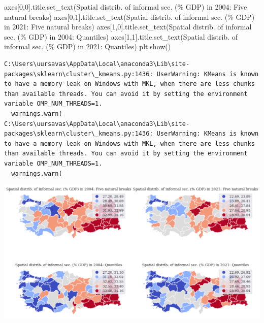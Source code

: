 \documentclass[
  letterpaper,
  DIV=11,
  numbers=noendperiod]{scrreprt}
\newenvironment{Shaded}{\begin{snugshade}}{\end{snugshade}}
\newcommand{\DecValTok}[1]{\textcolor[rgb]{0.68,0.00,0.00}{#1}}
\newcommand{\NormalTok}[1]{\textcolor[rgb]{0.00,0.23,0.31}{#1}}
\newcommand{\SpecialCharTok}[1]{\textcolor[rgb]{0.37,0.37,0.37}{#1}}
\newcommand{\StringTok}[1]{\textcolor[rgb]{0.13,0.47,0.30}{#1}}
\begin{document}
\begin{Shaded}
\begin{Highlighting}[]
\NormalTok{axes[}\DecValTok{0}\NormalTok{,}\DecValTok{0}\NormalTok{].title.set\_text(}\StringTok{\textquotesingle{}Spatial distrib. of informal sec. (}\SpecialCharTok{\% G}\StringTok{DP) in 2004: Five natural breaks\textquotesingle{}}\NormalTok{)}
\NormalTok{axes[}\DecValTok{0}\NormalTok{,}\DecValTok{1}\NormalTok{].title.set\_text(}\StringTok{\textquotesingle{}Spatial distrib. of informal sec. (}\SpecialCharTok{\% G}\StringTok{DP) in 2021: Five natural breaks\textquotesingle{}}\NormalTok{)}
\NormalTok{axes[}\DecValTok{1}\NormalTok{,}\DecValTok{0}\NormalTok{].title.set\_text(}\StringTok{\textquotesingle{}Spatial distrib. of informal sec. (}\SpecialCharTok{\% G}\StringTok{DP) in 2004: Quantiles\textquotesingle{}}\NormalTok{)}
\NormalTok{axes[}\DecValTok{1}\NormalTok{,}\DecValTok{1}\NormalTok{].title.set\_text(}\StringTok{\textquotesingle{}Spatial distrib. of informal sec. (}\SpecialCharTok{\% G}\StringTok{DP) in 2021: Quantiles\textquotesingle{}}\NormalTok{)}
\NormalTok{plt.show()}
\end{Highlighting}
\end{Shaded}

\begin{verbatim}
C:\Users\uursavas\AppData\Local\anaconda3\Lib\site-packages\sklearn\cluster\_kmeans.py:1436: UserWarning: KMeans is known to have a memory leak on Windows with MKL, when there are less chunks than available threads. You can avoid it by setting the environment variable OMP_NUM_THREADS=1.
  warnings.warn(
C:\Users\uursavas\AppData\Local\anaconda3\Lib\site-packages\sklearn\cluster\_kmeans.py:1436: UserWarning: KMeans is known to have a memory leak on Windows with MKL, when there are less chunks than available threads. You can avoid it by setting the environment variable OMP_NUM_THREADS=1.
  warnings.warn(
\end{verbatim}

\includegraphics{labs/final_informal_files/figure-pdf/cell-8-output-2.png}
\end{document}
